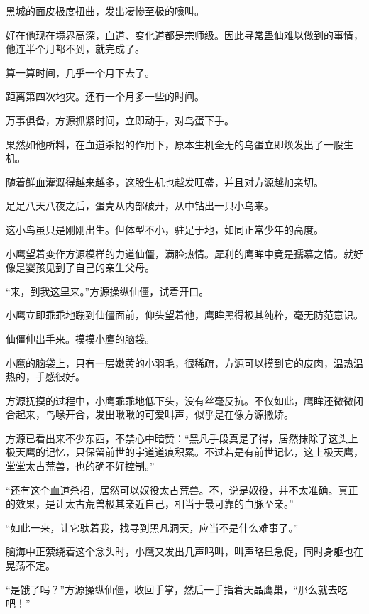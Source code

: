 
\begin{this_body}

黑城的面皮极度扭曲，发出凄惨至极的嚎叫。

好在他现在境界高深，血道、变化道都是宗师级。因此寻常蛊仙难以做到的事情，他连半个月都不到，就完成了。

算一算时间，几乎一个月下去了。

距离第四次地灾。还有一个月多一些的时间。

万事俱备，方源抓紧时间，立即动手，对鸟蛋下手。

果然如他所料，在血道杀招的作用下，原本生机全无的鸟蛋立即焕发出了一股生机。

随着鲜血灌溉得越来越多，这股生机也越发旺盛，并且对方源越加亲切。

足足八天八夜之后，蛋壳从内部破开，从中钻出一只小鸟来。

这小鸟虽只是刚刚出生。但体型不小，驻足于地，如同正常少年的高度。

小鹰望着变作方源模样的力道仙僵，满脸热情。犀利的鹰眸中竟是孺慕之情。就好像是婴孩见到了自己的亲生父母。

“来，到我这里来。”方源操纵仙僵，试着开口。

小鹰立即乖乖地蹦到仙僵面前，仰头望着他，鹰眸黑得极其纯粹，毫无防范意识。

仙僵伸出手来。摸摸小鹰的脑袋。

小鹰的脑袋上，只有一层嫩黄的小羽毛，很稀疏，方源可以摸到它的皮肉，温热温热的，手感很好。

方源抚摸的过程中，小鹰乖乖地低下头，没有丝毫反抗。不仅如此，鹰眸还微微闭合起来，鸟喙开合，发出啾啾的可爱叫声，似乎是在像方源撒娇。

方源已看出来不少东西，不禁心中暗赞：“黑凡手段真是了得，居然抹除了这头上极天鹰的记忆，只保留前世的宇道道痕积累。不过若是有前世记忆，这上极天鹰，堂堂太古荒兽，也的确不好控制。”

“还有这个血道杀招，居然可以奴役太古荒兽。不，说是奴役，并不太准确。真正的效果，是让太古荒兽极其亲近自己，相当于最可靠的血脉至亲。”

“如此一来，让它驮着我，找寻到黑凡洞天，应当不是什么难事了。”

脑海中正萦绕着这个念头时，小鹰又发出几声鸣叫，叫声略显急促，同时身躯也在晃荡不定。

“是饿了吗？”方源操纵仙僵，收回手掌，然后一手指着天晶鹰巢，“那么就去吃吧！”


\end{this_body}
